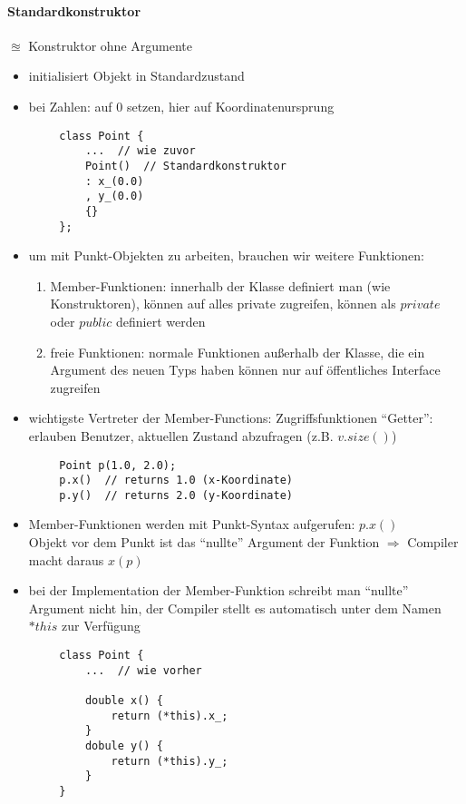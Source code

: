 \documentclass{article}
\begin{document}
	 \paragraph{Standardkonstruktor}
	 $\approxeq$ Konstruktor ohne Argumente
	 \begin{itemize}
	 	\item initialisiert Objekt in Standardzustand
	 	\item bei Zahlen: auf $0$ setzen, hier auf Koordinatenursprung
	 \end{itemize}
	 \begin{lstlisting}
	 	class Point {
	 		...  // wie zuvor
	 		Point()  // Standardkonstruktor
	 		: x_(0.0)
	 		, y_(0.0)
	 		{}
	 	};
	 \end{lstlisting}
	 \begin{itemize}
	 	\item um mit Punkt-Objekten zu arbeiten, brauchen wir weitere Funktionen:
	 	\begin{enumerate}
	 		\item Member-Funktionen: innerhalb der Klasse definiert man (wie Konstruktoren), können auf alles private zugreifen, können als $private$ oder $public$ definiert werden
	 		\item freie Funktionen: normale Funktionen außerhalb der Klasse, die ein Argument des neuen Typs haben können nur auf öffentliches Interface zugreifen
	 	\end{enumerate}
	 	\item wichtigste Vertreter der Member-Functions: Zugriffsfunktionen ``Getter'': erlauben Benutzer, aktuellen Zustand abzufragen (z.B. $v.size()$)
	 \end{itemize}
	 \begin{lstlisting}
	 	Point p(1.0, 2.0);
	 	p.x()  // returns 1.0 (x-Koordinate)
	 	p.y()  // returns 2.0 (y-Koordinate)
	 \end{lstlisting}
	 \begin{itemize}
	 	\item Member-Funktionen werden mit Punkt-Syntax aufgerufen: $p.x()$ \\
	 	Objekt vor dem Punkt ist das ``nullte'' Argument der Funktion $\Rightarrow $ Compiler macht daraus $x(p)$
	 	\item bei der Implementation der Member-Funktion schreibt man ``nullte'' Argument nicht hin, der Compiler stellt es automatisch unter dem Namen $*this$ zur Verfügung
	 \end{itemize}

	 \begin{lstlisting}
	 	class Point {
	 		...  // wie vorher

	 		double x() {
	 			return (*this).x_;
	 		}
	 		dobule y() {
	 			return (*this).y_;
	 		}
	 	}
	 \end{lstlisting}
\end{document}
